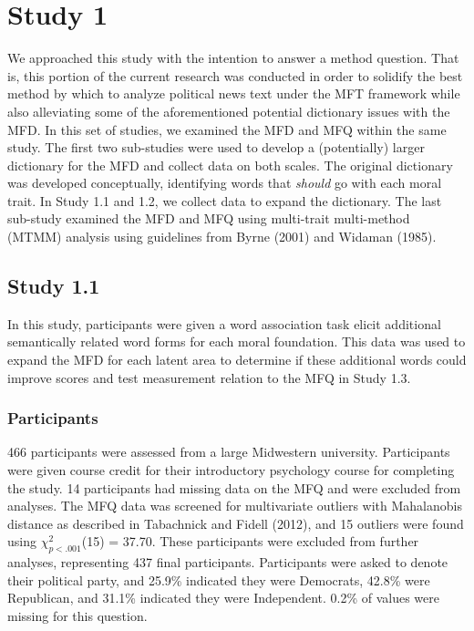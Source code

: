 \documentclass[
  man,floatsintext]{apa6}
\begin{document}
\section{Study 1}\label{study-1}

We approached this study with the intention to answer a method question.
That is, this portion of the current research was conducted in order to
solidify the best method by which to analyze political news text under
the MFT framework while also alleviating some of the aforementioned
potential dictionary issues with the MFD. In this set of studies, we
examined the MFD and MFQ within the same study. The first two
sub-studies were used to develop a (potentially) larger dictionary for
the MFD and collect data on both scales. The original dictionary was
developed conceptually, identifying words that \emph{should} go with each
moral trait. In Study 1.1 and 1.2, we collect data to expand the
dictionary. The last sub-study examined the MFD and MFQ using
multi-trait multi-method (MTMM) analysis using guidelines from
Byrne (2001) and Widaman (1985).

\subsection{Study 1.1}\label{study-1.1}

In this study, participants were given a word association task elicit
additional semantically related word forms for each moral foundation.
This data was used to expand the MFD for each latent area to determine
if these additional words could improve scores and test measurement
relation to the MFQ in Study 1.3.

\subsubsection{Participants}\label{participants}

466 participants were assessed from a large Midwestern
university. Participants were given course credit for their introductory
psychology course for completing the study. 14
participants had missing data on the MFQ and were excluded from
analyses. The MFQ data was screened for multivariate outliers with
Mahalanobis distance as described in Tabachnick and Fidell (2012), and
15 outliers were found using
\(\chi^2_{p < .001}\)(15) = 37.70. These participants
were excluded from further analyses, representing 437
final participants. Participants were asked to denote their political
party, and 25.9\%
indicated they were Democrats,
42.8\% were
Republican, and
31.1\% indicated
they were Independent. 0.2\%
of values were missing for this question.
\end{document}
